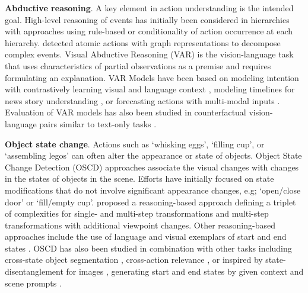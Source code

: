 \documentclass[smallextended,twocolumn,natbib]{svjour3}
\begin{document}
\noindent
\textbf{Abductive reasoning}. A key element in action understanding is the intended goal. High-level reasoning of events has initially been considered in hierarchies with approaches using rule-based \citep{hakeem2004ontology} or conditionality of action occurrence \citep{albanese2010pads} at each hierarchy. \citet{pei2011parsing} detected atomic actions with graph representations to decompose complex events. Visual Abductive Reasoning (VAR) \citep{liang2022visual} is the vision-language task that uses characteristics of partial observations as a premise and requires formulating an explanation. VAR Models have been based on modeling intention with contrastively learning visual and language context \citep{li2023intentqa}, modeling timelines for news story understanding \citep{liu2023video}, or forecasting actions with multi-modal inputs \citep{zhu2023personality}. Evaluation of VAR models has also been studied in counterfactual vision-language pairs \citep{park2022exposing} similar to text-only tasks \citep{ippolito2019unsupervised,huang2020inset}.

\noindent
\textbf{Object state change}. Actions such as `whisking eggs', `filling cup', or `assembling legos' can often alter the appearance or state of objects. Object State Change Detection (OSCD) approaches associate the visual changes with changes in the states of objects in the scene. Efforts \citep{alayrac2017joint,liu2017jointly,zhuo2019explainable} have initially focused on state modifications that do not involve significant appearance changes, e.g; `open/close door' or `fill/empty cup'. \citet{hong2021transformation} proposed a reasoning-based approach defining a triplet of complexities for single- and multi-step transformations and multi-step transformations with additional viewpoint changes. Other reasoning-based approaches include the use of language \citep{xue2024learning} and visual exemplars of start and end states \citep{souvcek2022look}. OSCD has also been studied in combination with other tasks including cross-state object segmentation \citep{yu2023video}, cross-action relevance \citep{alayrac2024multi}, or inspired by state-disentanglement for images \citep{gouidis2023leveraging,nagarajan2018attributes,saini2022disentangling}, generating start and end states by given context and scene prompts \citep{saini2023chop}.
\end{document}
